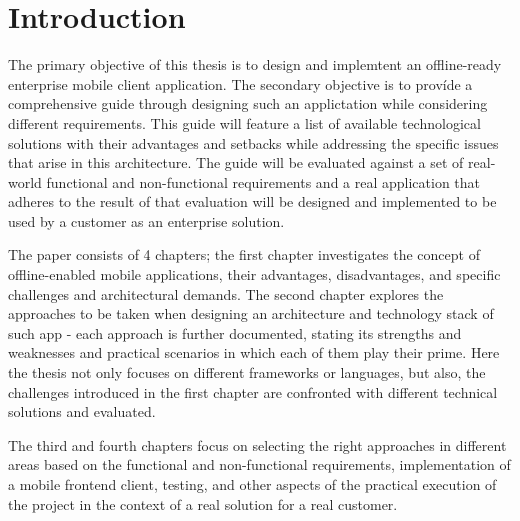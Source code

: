 \documentclass[
  digital,     %
  color,       %
  oneside,     %
  nosansbold,  %
  nocolorbold, %
  lof,         %
  lot,         %
]{fithesis4}
\begin{document}
\chapter*{Introduction}

The primary objective of this thesis is to design and implemtent an offline-ready enterprise mobile client application. The secondary objective is to províde a comprehensive guide through designing such an applictation while considering different requirements. This guide will feature a list of available technological solutions with their advantages and setbacks while addressing the specific issues that arise in this architecture. The guide will be evaluated against a set of real-world functional and non-functional requirements and a real application that adheres to the result of that evaluation will be designed and implemented to be used by a customer as an enterprise solution.

The paper consists of 4 chapters; the first chapter investigates the concept of offline-enabled mobile applications, their advantages, disadvantages, and specific challenges and architectural demands. The second chapter explores the approaches to be taken when designing an architecture and technology stack of such app - each approach is further documented, stating its strengths and weaknesses and practical scenarios in which each of them play their prime. Here the thesis not only focuses on different frameworks or languages, but also, the challenges introduced in the first chapter are confronted with different technical solutions and evaluated.

The third and fourth chapters focus on selecting the right approaches in different areas based on the functional and non-functional requirements, implementation of a mobile frontend client, testing, and other aspects of the practical execution of the project in the context of a real solution for a real customer.
\end{document}

